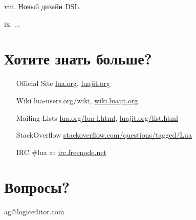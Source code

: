 \documentclass[aspectratio=169,handout,bigger]{beamer}
\begin{document}
\begin{frame}
viii. Новый дизайн DSL.
\end{frame}

\begin{frame}
ix. ...
\end{frame}


\section{Хотите знать больше?}

\begin{frame}
  \begin{center}
  \begin{minipage}{0.6\linewidth}
  \begin{itemize}
    \item[Official Site] \url{lua.org}, \url{luajit.org}
    \item[Wiki] lua-users.org/wiki, \url{wiki.luajit.org}
    \item[Mailing Lists] \url{lua.org/lua-l.html}, \url{luajit.org/list.html}
    \item[StackOverflow] \url{stackoverflow.com/questions/tagged/Lua}
    \item[IRC] \#lua at \url{irc.freenode.net}
  \end{itemize}
  \end{minipage}
  \end{center}
\end{frame}


\section*{Вопросы?}

\begin{frame}

\begin{center}
\Huge{ag@logiceditor.com}
\end{center}

\end{frame}

\end{document}
